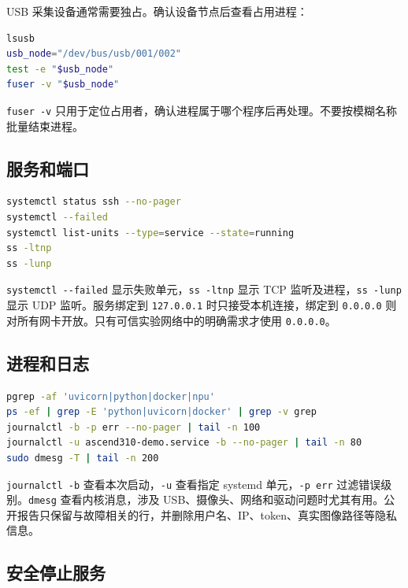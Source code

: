USB 采集设备通常需要独占。确认设备节点后查看占用进程：

\begin{lstlisting}[language=bash]
lsusb
usb_node="/dev/bus/usb/001/002"
test -e "$usb_node"
fuser -v "$usb_node"
\end{lstlisting}

\passthrough{\lstinline!fuser -v!}
只用于定位占用者，确认进程属于哪个程序后再处理。不要按模糊名称批量结束进程。

\subsection{服务和端口}\label{ux670dux52a1ux548cux7aefux53e3}

\begin{lstlisting}[language=bash]
systemctl status ssh --no-pager
systemctl --failed
systemctl list-units --type=service --state=running
ss -ltnp
ss -lunp
\end{lstlisting}

\passthrough{\lstinline!systemctl --failed!}
显示失败单元，\passthrough{\lstinline!ss -ltnp!} 显示 TCP
监听及进程，\passthrough{\lstinline!ss -lunp!} 显示 UDP 监听。服务绑定到
\passthrough{\lstinline!127.0.0.1!} 时只接受本机连接，绑定到
\passthrough{\lstinline!0.0.0.0!}
则对所有网卡开放。只有可信实验网络中的明确需求才使用
\passthrough{\lstinline!0.0.0.0!}。

\subsection{进程和日志}\label{ux8fdbux7a0bux548cux65e5ux5fd7}

\begin{lstlisting}[language=bash]
pgrep -af 'uvicorn|python|docker|npu'
ps -ef | grep -E 'python|uvicorn|docker' | grep -v grep
journalctl -b -p err --no-pager | tail -n 100
journalctl -u ascend310-demo.service -b --no-pager | tail -n 80
sudo dmesg -T | tail -n 200
\end{lstlisting}

\passthrough{\lstinline!journalctl -b!}
查看本次启动，\passthrough{\lstinline!-u!} 查看指定 systemd
单元，\passthrough{\lstinline!-p err!}
过滤错误级别。\passthrough{\lstinline!dmesg!} 查看内核消息，涉及
USB、摄像头、网络和驱动问题时尤其有用。公开报告只保留与故障相关的行，并删除用户名、IP、token、真实图像路径等隐私信息。

\subsection{安全停止服务}\label{ux5b89ux5168ux505cux6b62ux670dux52a1}

